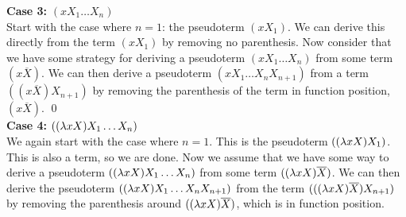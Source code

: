 \textbf{Case 3:} $(x X_1\ldots X_n)$\\
Start with the case where $n = 1$: the pseudoterm $(x X_1)$. We can derive this directly from the term $(x X_1)$ by removing no parenthesis. Now consider that we have some strategy for deriving a pseudoterm $(x X_1\ldots X_n)$ from some term $(x\overline{X})$. We can then derive a pseudoterm $(x X_1\ldots X_{n}X_{n+1})$ from a term $((x\overline{X})X_{n+1})$ by removing the parenthesis of the term in function position, $(x\overline{X})$. \qed\\

\textbf{Case 4:} $((\lambda xX)X_1\ldots X_n)$\\
We again start with the case where $n = 1$. This is the pseudoterm $((\lambda xX)X_1)$. This is also a term, so we are done. Now we assume that we have some way to derive a pseudoterm $((\lambda xX)X_1\ldots X_n)$ from some term $((\lambda xX)\overline{X})$. We can then derive the pseudoterm $((\lambda xX)X_1\ldots X_nX_{n+1})$ from the term $(((\lambda xX)\overline{X})X_{n+1})$ by removing the parenthesis around $((\lambda xX)\overline{X})$, which is in function position. \qqed\\